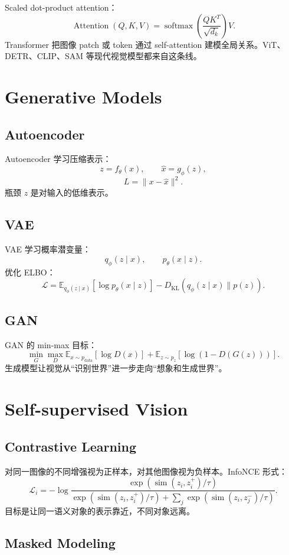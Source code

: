 \documentclass[11pt]{article}
\newcommand{\softmax}{\operatorname{softmax}}
\newcommand{\E}{\mathbb{E}}
\newcommand{\KL}{D_{\mathrm{KL}}}
\begin{document}
Scaled dot-product attention：
\[
  \operatorname{Attention}(Q,K,V)
  =
  \softmax\left(\frac{QK^T}{\sqrt{d_k}}\right)V.
\]
Transformer 把图像 patch 或 token 通过 self-attention 建模全局关系。ViT、DETR、CLIP、SAM 等现代视觉模型都来自这条线。

\section{Generative Models}

\subsection{Autoencoder}

Autoencoder 学习压缩表示：
\[
  z=f_\theta(x),\qquad \hat x=g_\phi(z),
\]
\[
  L=\|x-\hat x\|^2.
\]
瓶颈 $z$ 是对输入的低维表示。

\subsection{VAE}

VAE 学习概率潜变量：
\[
  q_\phi(z\mid x),\qquad p_\theta(x\mid z).
\]
优化 ELBO：
\[
  \mathcal L
  =
  \E_{q_\phi(z\mid x)}[\log p_\theta(x\mid z)]
  -
  \KL(q_\phi(z\mid x)\|p(z)).
\]

\subsection{GAN}

GAN 的 min-max 目标：
\[
  \min_G\max_D
  \E_{x\sim p_{\text{data}}}[\log D(x)]
  +
  \E_{z\sim p_z}[\log(1-D(G(z)))].
\]
生成模型让视觉从“识别世界”进一步走向“想象和生成世界”。

\section{Self-supervised Vision}

\subsection{Contrastive Learning}

对同一图像的不同增强视为正样本，对其他图像视为负样本。InfoNCE 形式：
\[
  \mathcal L_i=
  -\log
  \frac{\exp(\operatorname{sim}(z_i,z_i^+)/\tau)}
  {\exp(\operatorname{sim}(z_i,z_i^+)/\tau)+
  \sum_{j}\exp(\operatorname{sim}(z_i,z_j^-)/\tau)}.
\]
目标是让同一语义对象的表示靠近，不同对象远离。

\subsection{Masked Modeling}
\end{document}
